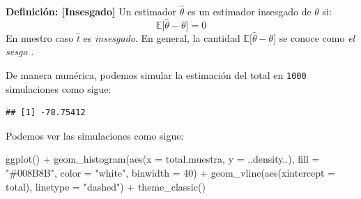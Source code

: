 \documentclass[
]{book}
\newenvironment{Shaded}{\begin{snugshade}}{\end{snugshade}}
\newcommand{\AttributeTok}[1]{\textcolor[rgb]{0.77,0.63,0.00}{#1}}
\newcommand{\ConstantTok}[1]{\textcolor[rgb]{0.00,0.00,0.00}{#1}}
\newcommand{\ControlFlowTok}[1]{\textcolor[rgb]{0.13,0.29,0.53}{\textbf{#1}}}
\newcommand{\DecValTok}[1]{\textcolor[rgb]{0.00,0.00,0.81}{#1}}
\newcommand{\FunctionTok}[1]{\textcolor[rgb]{0.00,0.00,0.00}{#1}}
\newcommand{\NormalTok}[1]{#1}
\newcommand{\OtherTok}[1]{\textcolor[rgb]{0.56,0.35,0.01}{#1}}
\newcommand{\SpecialCharTok}[1]{\textcolor[rgb]{0.00,0.00,0.00}{#1}}
\newcommand{\StringTok}[1]{\textcolor[rgb]{0.31,0.60,0.02}{#1}}
\begin{document}
\textbf{Definición: {[}Insesgado{]}} Un estimador \(\hat{\theta}\) es un estimador insesgado de \(\theta\) si:
\[
\mathbb{E}\big[ \hat{\theta} - \theta] = 0
\]
En nuestro caso \(\hat{t}\) es \emph{insesgado}. En general, la cantidad \(\mathbb{E}\big[ \hat{\theta} - \theta]\) se conoce como \emph{el sesgo} .

De manera numérica, podemos simular la estimación del total en \texttt{1000} simulaciones como sigue:

\begin{Shaded}
\end{Shaded}

\begin{verbatim}
## [1] -78.75412
\end{verbatim}

Podemos ver las simulaciones como sigue:

\begin{Shaded}
\begin{Highlighting}[]
\FunctionTok{ggplot}\NormalTok{() }\SpecialCharTok{+}
  \FunctionTok{geom\_histogram}\NormalTok{(}\FunctionTok{aes}\NormalTok{(}\AttributeTok{x =}\NormalTok{ total.muestra, }\AttributeTok{y =}\NormalTok{ ..density..), }\AttributeTok{fill =} \StringTok{"\#008B8B"}\NormalTok{, }
                 \AttributeTok{color =} \StringTok{"white"}\NormalTok{, }\AttributeTok{binwidth =} \DecValTok{40}\NormalTok{) }\SpecialCharTok{+} 
  \FunctionTok{geom\_vline}\NormalTok{(}\FunctionTok{aes}\NormalTok{(}\AttributeTok{xintercept =}\NormalTok{ total), }\AttributeTok{linetype =} \StringTok{"dashed"}\NormalTok{) }\SpecialCharTok{+}
  \FunctionTok{theme\_classic}\NormalTok{() }
\end{Highlighting}
\end{Shaded}
\end{document}
